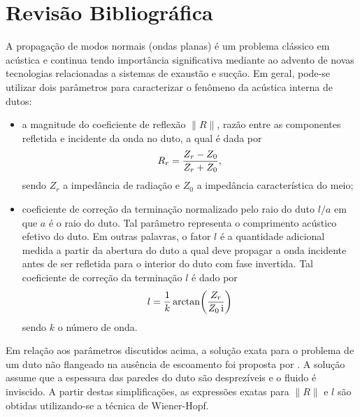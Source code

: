 \chapter{Revisão Bibliográfica}

A propagação de modos normais (ondas planas) é um problema clássico em acústica e continua tendo importância significativa mediante ao advento de novas tecnologias relacionadas a sistemas de exaustão e sucção. Em geral, pode-se utilizar dois parâmetros para caracterizar o fenômeno da acústica interna de dutos:

\begin{itemize}
    \item a magnitude do coeficiente de reflexão $\|R\|$, razão entre as componentes refletida e incidente da onda no duto, a qual é dada por
    \begin{equation}
        R_{r}\simbolo{$R_{r}$}{Coeficiente de reflexão} =\frac{Z_{r} - Z_{0}}{Z_{r} + Z_{0}},
        \label{eq:R}
    \end{equation}
    sendo $Z_{r}$ a impedância de radiação e $Z_{0}$ a impedância característica do meio;
    
    \item coeficiente de correção da terminação normalizado pelo raio do duto $l/a$ em que $a$ é o raio do duto. Tal parâmetro representa o comprimento acústico efetivo do duto. Em outras palavras, o fator $l$ é a quantidade adicional medida a partir da abertura do duto a qual deve propagar a onda incidente antes de ser refletida para o interior do duto com fase invertida. Tal coeficiente de correção da terminação $l$ é dado por
    \begin{equation}
        l = \frac{1}{k} \arctan\!\left(\frac{Z_{r}}{Z_{0} \, \mathrm{i}\simbolo{$i$}{Número imaginário}}\right)
        \label{eq:l}
    \end{equation}
    sendo $k$ o número de onda.
\end{itemize}

Em relação aos parâmetros discutidos acima, a solução exata para o problema de um duto não flangeado na ausência de escoamento foi proposta por . A solução assume que a espessura das paredes do duto são desprezíveis e o fluido é inviscido. A partir destas simplificações, as expressões exatas para $\|R\|$ e $l$ são obtidas utilizando-se a técnica de Wiener-Hopf.


